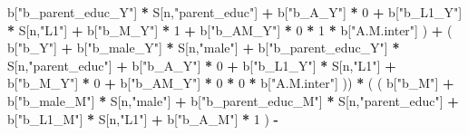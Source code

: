 \documentclass[
]{book}
\newenvironment{Shaded}{\begin{snugshade}}{\end{snugshade}}
\newcommand{\DecValTok}[1]{\textcolor[rgb]{0.00,0.00,0.81}{#1}}
\newcommand{\NormalTok}[1]{#1}
\newcommand{\SpecialCharTok}[1]{\textcolor[rgb]{0.81,0.36,0.00}{\textbf{#1}}}
\newcommand{\StringTok}[1]{\textcolor[rgb]{0.31,0.60,0.02}{#1}}
\begin{document}
\begin{Shaded}
\begin{Highlighting}[]
\NormalTok{                                 b[}\StringTok{"b\_parent\_educ\_Y"}\NormalTok{] }\SpecialCharTok{*}\NormalTok{ S[n,}\StringTok{"parent\_educ"}\NormalTok{] }\SpecialCharTok{+} 
\NormalTok{                                 b[}\StringTok{"b\_A\_Y"}\NormalTok{] }\SpecialCharTok{*} \DecValTok{0} \SpecialCharTok{+} 
\NormalTok{                                 b[}\StringTok{"b\_L1\_Y"}\NormalTok{] }\SpecialCharTok{*}\NormalTok{ S[n,}\StringTok{"L1"}\NormalTok{] }\SpecialCharTok{+}
\NormalTok{                                 b[}\StringTok{"b\_M\_Y"}\NormalTok{] }\SpecialCharTok{*} \DecValTok{1} \SpecialCharTok{+}
\NormalTok{                                 b[}\StringTok{"b\_AM\_Y"}\NormalTok{] }\SpecialCharTok{*} \DecValTok{0} \SpecialCharTok{*} \DecValTok{1} \SpecialCharTok{*}\NormalTok{ b[}\StringTok{"A.M.inter"}\NormalTok{] ) }\SpecialCharTok{+} 
\NormalTok{                             ( b[}\StringTok{"b\_Y"}\NormalTok{] }\SpecialCharTok{+} 
\NormalTok{                                 b[}\StringTok{"b\_male\_Y"}\NormalTok{] }\SpecialCharTok{*}\NormalTok{ S[n,}\StringTok{"male"}\NormalTok{] }\SpecialCharTok{+} 
\NormalTok{                                 b[}\StringTok{"b\_parent\_educ\_Y"}\NormalTok{] }\SpecialCharTok{*}\NormalTok{ S[n,}\StringTok{"parent\_educ"}\NormalTok{] }\SpecialCharTok{+} 
\NormalTok{                                 b[}\StringTok{"b\_A\_Y"}\NormalTok{] }\SpecialCharTok{*} \DecValTok{0} \SpecialCharTok{+} 
\NormalTok{                                 b[}\StringTok{"b\_L1\_Y"}\NormalTok{] }\SpecialCharTok{*}\NormalTok{ S[n,}\StringTok{"L1"}\NormalTok{] }\SpecialCharTok{+}
\NormalTok{                                 b[}\StringTok{"b\_M\_Y"}\NormalTok{] }\SpecialCharTok{*} \DecValTok{0} \SpecialCharTok{+}
\NormalTok{                                 b[}\StringTok{"b\_AM\_Y"}\NormalTok{] }\SpecialCharTok{*} \DecValTok{0} \SpecialCharTok{*} \DecValTok{0} \SpecialCharTok{*}\NormalTok{ b[}\StringTok{"A.M.inter"}\NormalTok{] )) }\SpecialCharTok{*}
\NormalTok{      ( ( b[}\StringTok{"b\_M"}\NormalTok{] }\SpecialCharTok{+} 
\NormalTok{            b[}\StringTok{"b\_male\_M"}\NormalTok{] }\SpecialCharTok{*}\NormalTok{ S[n,}\StringTok{"male"}\NormalTok{] }\SpecialCharTok{+} 
\NormalTok{            b[}\StringTok{"b\_parent\_educ\_M"}\NormalTok{] }\SpecialCharTok{*}\NormalTok{ S[n,}\StringTok{"parent\_educ"}\NormalTok{] }\SpecialCharTok{+} 
\NormalTok{            b[}\StringTok{"b\_L1\_M"}\NormalTok{] }\SpecialCharTok{*}\NormalTok{ S[n,}\StringTok{"L1"}\NormalTok{] }\SpecialCharTok{+}
\NormalTok{            b[}\StringTok{"b\_A\_M"}\NormalTok{] }\SpecialCharTok{*} \DecValTok{1}\NormalTok{ ) }\SpecialCharTok{{-}} 

\end{Highlighting}
\end{Shaded}
\end{document}
